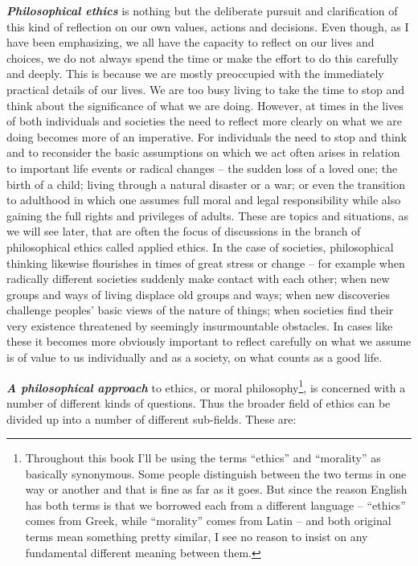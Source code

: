 \documentclass[12pt, openany]{book}
\begin{document}
\textbf{\emph{Philosophical ethics}} is nothing but the deliberate pursuit and clarification of this kind of reflection on our own values, actions and decisions. Even though, as I have been emphasizing, we all have the capacity to reflect on our lives and choices, we do not always spend the time or make the effort to do this carefully and deeply. This is because we are mostly preoccupied with the immediately practical details of our lives. We are too busy living to take the time to stop and think about the significance of what we are doing. However, at times in the lives of both individuals and societies the need to reflect more clearly on what we are doing becomes more of an imperative. For individuals the need to stop and think and to reconsider the basic assumptions on which we act often arises in relation to important life events or radical changes -- the sudden loss of a loved one; the birth of a child; living through a natural disaster or a war; or even the transition to adulthood in which one assumes full moral and legal responsibility while also gaining the full rights and privileges of adults. These are topics and situations, as we will see later, that are often the focus of discussions in the branch of philosophical ethics called applied ethics. In the case of societies, philosophical thinking likewise flourishes in times of great stress or change -- for example when radically different societies suddenly make contact with each other; when new groups and ways of living displace old groups and ways; when new discoveries challenge peoples' basic views of the nature of things; when societies find their very existence threatened by seemingly insurmountable obstacles. In cases like these it becomes more obviously important to reflect carefully on what we assume is of value to us individually and as a society, on what counts as a good life.

\textbf{\emph{A philosophical approach}} to ethics, or moral philosophy\footnote{Throughout this book I'll be using the terms ``ethics'' and ``morality'' as basically synonymous. Some people distinguish between the two terms in one way or another and that is fine as far as it goes. But since the reason English has both terms is that we borrowed each from a different language -- ``ethics'' comes from Greek, while ``morality'' comes from Latin -- and both original terms mean something pretty similar, I see no reason to insist on any fundamental different meaning between them.}, is concerned with a number of different kinds of questions. Thus the broader field of ethics can be divided up into a number of different sub-fields. These are:
\end{document}
